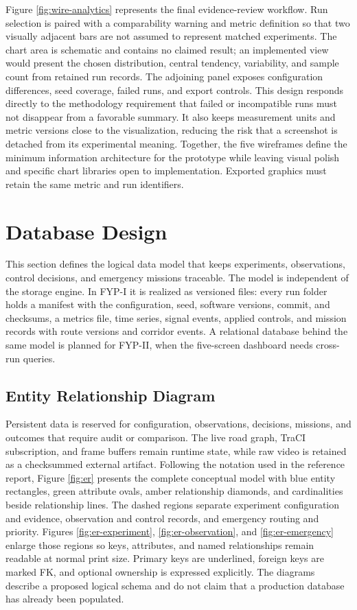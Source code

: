 Figure \ref{fig:wire-analytics} represents the final evidence-review workflow. Run selection is paired with a comparability warning and metric definition so that two visually adjacent bars are not assumed to represent matched experiments. The chart area is schematic and contains no claimed result; an implemented view would present the chosen distribution, central tendency, variability, and sample count from retained run records. The adjoining panel exposes configuration differences, seed coverage, failed runs, and export controls. This design responds directly to the methodology requirement that failed or incompatible runs must not disappear from a favorable summary. It also keeps measurement units and metric versions close to the visualization, reducing the risk that a screenshot is detached from its experimental meaning. Together, the five wireframes define the minimum information architecture for the prototype while leaving visual polish and specific chart libraries open to implementation. Exported graphics must retain the same metric and run identifiers.


\section{Database Design}
\label{sec:data-design}

This section defines the logical data model that keeps experiments, observations, control decisions, and emergency missions traceable. The model is independent of the storage engine. In FYP-I it is realized as versioned files: every run folder holds a manifest with the configuration, seed, software versions, commit, and checksums, a metrics file, time series, signal events, applied controls, and mission records with route versions and corridor events. A relational database behind the same model is planned for FYP-II, when the five-screen dashboard needs cross-run queries.

\subsection{Entity Relationship Diagram}

Persistent data is reserved for configuration, observations, decisions, missions, and outcomes that require audit or comparison. The live road graph, TraCI subscription, and frame buffers remain runtime state, while raw video is retained as a checksummed external artifact. Following the notation used in the reference report, Figure \ref{fig:er} presents the complete conceptual model with blue entity rectangles, green attribute ovals, amber relationship diamonds, and cardinalities beside relationship lines. The dashed regions separate experiment configuration and evidence, observation and control records, and emergency routing and priority. Figures \ref{fig:er-experiment}, \ref{fig:er-observation}, and \ref{fig:er-emergency} enlarge those regions so keys, attributes, and named relationships remain readable at normal print size. Primary keys are underlined, foreign keys are marked FK, and optional ownership is expressed explicitly. The diagrams describe a proposed logical schema and do not claim that a production database has already been populated.

